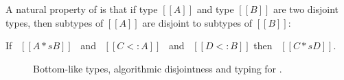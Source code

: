 \begin{comment}
\begin{proof}
  By induction on type A.
  \begin{itemize}
    \item Case $[[Top]]$ requires \Cref{lemma:union:bl-disj}.
    \item Case $[[Bot]]$ is trivial to prove.
    \item Case $[[Int]]$ requires induction on type B and
          \Cref{lemma:union:bl-disj,lemma:union:disj-sym}.
    \item Case $[[A -> B]]$ requires induction on type B and \Cref{lemma:union:disj-sym}.
    \item Case $[[A \/ B]]$ follows directly from inductive hypothesis.
  \end{itemize}
\end{proof}
\end{comment}


\begin{comment}
\begin{lemma}[Bottom-Like Disjoint]
  If \ $[[botlike A]]$ \ then \ $[[A * B]]$.
\label{lemma:union:bl-disjoint}
\end{lemma}
\end{comment}

\noindent A natural property of \cal is
that if type $[[A]]$ and type $[[B]]$ are two disjoint types, then subtypes
of $[[A]]$ are disjoint to subtypes of $[[B]]$:

\begin{lemma}
  If \ $[[A *s B]]$ \ and \ $[[C <: A]]$ \ and \ $[[D <: B]]$  then \ $[[C *s D]]$.
\label{lemma:union:disj-sub}
\end{lemma}



\begin{figure}[t]
  \begin{small}
    \centering
  \end{small}
  \begin{small}
    \centering
  \end{small}
  \begin{small}
    \centering
  \end{small}
  \caption{Bottom-like types, algorithmic disjointness and typing for \cal.}
  \label{fig:union:disj-typ}
\end{figure}


